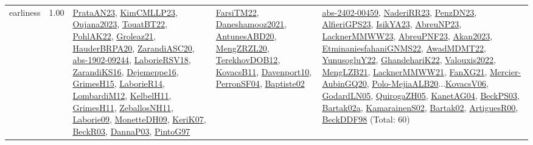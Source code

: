 {\begin{longtable}{p{3cm}r>{\raggedright\arraybackslash}p{6cm}>{\raggedright\arraybackslash}p{6cm}>{\raggedright\arraybackslash}p{8cm}}
\index{earliness}\index{Concepts!earliness}earliness &  1.00 & \hyperref[detail:PrataAN23]{PrataAN23}, \hyperref[detail:KimCMLLP23]{KimCMLLP23}, \hyperref[detail:Oujana2023]{Oujana2023}, \hyperref[detail:TouatBT22]{TouatBT22}, \hyperref[detail:PohlAK22]{PohlAK22}, \hyperref[detail:Groleaz21]{Groleaz21}, \hyperref[detail:HauderBRPA20]{HauderBRPA20}, \hyperref[detail:ZarandiASC20]{ZarandiASC20}, \hyperref[detail:abs-1902-09244]{abs-1902-09244}, \hyperref[detail:LaborieRSV18]{LaborieRSV18}, \hyperref[detail:ZarandiKS16]{ZarandiKS16}, \hyperref[detail:Dejemeppe16]{Dejemeppe16}, \hyperref[detail:GrimesH15]{GrimesH15}, \hyperref[detail:LaborieR14]{LaborieR14}, \hyperref[detail:LombardiM12]{LombardiM12}, \hyperref[detail:KelbelH11]{KelbelH11}, \hyperref[detail:GrimesH11]{GrimesH11}, \hyperref[detail:ZeballosNH11]{ZeballosNH11}, \hyperref[detail:Laborie09]{Laborie09}, \hyperref[detail:MonetteDH09]{MonetteDH09}, \hyperref[detail:KeriK07]{KeriK07}, \hyperref[detail:BeckR03]{BeckR03}, \hyperref[detail:DannaP03]{DannaP03}, \hyperref[detail:PintoG97]{PintoG97} & \hyperref[detail:FarsiTM22]{FarsiTM22}, \hyperref[detail:Daneshamooz2021]{Daneshamooz2021}, \hyperref[detail:AntunesABD20]{AntunesABD20}, \hyperref[detail:MengZRZL20]{MengZRZL20}, \hyperref[detail:TerekhovDOB12]{TerekhovDOB12}, \hyperref[detail:KovacsB11]{KovacsB11}, \hyperref[detail:Davenport10]{Davenport10}, \hyperref[detail:PerronSF04]{PerronSF04}, \hyperref[detail:Baptiste02]{Baptiste02} & \hyperref[detail:abs-2402-00459]{abs-2402-00459}, \hyperref[detail:NaderiRR23]{NaderiRR23}, \hyperref[detail:PenzDN23]{PenzDN23}, \hyperref[detail:AlfieriGPS23]{AlfieriGPS23}, \hyperref[detail:IsikYA23]{IsikYA23}, \hyperref[detail:AbreuNP23]{AbreuNP23}, \hyperref[detail:LacknerMMWW23]{LacknerMMWW23}, \hyperref[detail:AbreuPNF23]{AbreuPNF23}, \hyperref[detail:Akan2023]{Akan2023}, \hyperref[detail:EtminaniesfahaniGNMS22]{EtminaniesfahaniGNMS22}, \hyperref[detail:AwadMDMT22]{AwadMDMT22}, \hyperref[detail:YunusogluY22]{YunusogluY22}, \hyperref[detail:GhandehariK22]{GhandehariK22}, \hyperref[detail:Valouxis2022]{Valouxis2022}, \hyperref[detail:MengLZB21]{MengLZB21}, \hyperref[detail:LacknerMMWW21]{LacknerMMWW21}, \hyperref[detail:FanXG21]{FanXG21}, \hyperref[detail:Mercier-AubinGQ20]{Mercier-AubinGQ20}, \hyperref[detail:Polo-MejiaALB20]{Polo-MejiaALB20}...\hyperref[detail:KovacsV06]{KovacsV06}, \hyperref[detail:GodardLN05]{GodardLN05}, \hyperref[detail:QuirogaZH05]{QuirogaZH05}, \hyperref[detail:KanetAG04]{KanetAG04}, \hyperref[detail:BeckPS03]{BeckPS03}, \hyperref[detail:Bartak02a]{Bartak02a}, \hyperref[detail:KamarainenS02]{KamarainenS02}, \hyperref[detail:Bartak02]{Bartak02}, \hyperref[detail:ArtiguesR00]{ArtiguesR00}, \hyperref[detail:BeckDDF98]{BeckDDF98} (Total: 60)\\

\end{longtable}}
